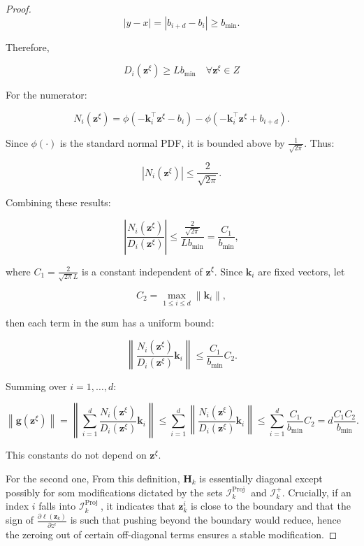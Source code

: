 \documentclass{article}
\theoremstyle{plain}
\theoremstyle{definition}
\def \H {\mathbf{H}}
\def \sI {\mathcal{I}}
\def \H {\mathbf{H}}
\def \H {\mathbf{H}}
\begin{document}
\begin{proof}
\[
|y-x|=\left|b_{i+d}-b_i\right| \geq b_{\min}.
\]


Therefore,

\[
D_i\left(\mathbf{z}^{\xi}\right) \geq L b_{\min } \quad \forall \mathbf{z}^{\xi} \in Z
\]

For the numerator:

\[
N_i\left(\mathbf{z}^{\xi}\right)=\phi\left(-\mathbf{k}_i^{\top} \mathbf{z}^{\xi}-b_i\right)-\phi\left(-\mathbf{k}_i^{\top} \mathbf{z}^{\xi}+b_{i+d}\right) .
\]


Since $\phi(\cdot)$ is the standard normal PDF, it is bounded above by $\frac{1}{\sqrt{2 \pi}}$. Thus:

\[
\left|N_i\left(\mathbf{z}^{\xi}\right)\right| \leq \frac{2}{\sqrt{2 \pi}}.
\]


Combining these results:

\[
\left|\frac{N_i\left(\mathbf{z}^{\xi}\right)}{D_i\left(\mathbf{z}^{\xi}\right)}\right| \leq \frac{\frac{2}{\sqrt{2 \pi}}}{L b_{\min }}=\frac{C_1}{b_{\min }},
\]

where $C_1=\frac{2}{\sqrt{2 \pi} L}$ is a constant independent of $\mathbf{z}^{\xi}$. 
Since $\mathbf{k}_i$ are fixed vectors, let

\[
C_2=\max _{1 \leq i \leq d}\left\|\mathbf{k}_i\right\|, 
\]


then each term in the sum has a uniform bound: 

\[
  \left\|\frac{N_i\left(\mathbf{z}^{\xi}\right)}{D_i\left(\mathbf{z}^{\xi}\right)} \mathbf{k}_i\right\| \leq \frac{C_1}{b_{\min }} C_2.
\]


Summing over $i=1, \ldots, d$: 

\[
  \left\|\mathbf{g}\left(\mathbf{z}^{\xi}\right)\right\|=\left\|\sum_{i=1}^d \frac{N_i\left(\mathbf{z}^{\xi}\right)}{D_i\left(\mathbf{z}^{\xi}\right)} \mathbf{k}_i\right\| \leq \sum_{i=1}^d\left\|\frac{N_i\left(\mathbf{z}^{\xi}\right)}{D_i\left(\mathbf{z}^{\xi}\right)} \mathbf{k}_i\right\| \leq \sum_{i=1}^d \frac{C_1}{b_{\min }} C_2=d \frac{C_1 C_2}{b_{\min }}.
\]


This constants do not depend on $\mathbf{z}^{\xi}$. 

For the second one, From this definition, $\H_k$ is essentially diagonal except possibly for som modifications dictated by the sets $\sI_k^{\text {Proj }}$ and $\sI_k^{+}$. Crucially, if an index $i$ falls into $\sI_k^{\text {Proj }}$, it indicates that $\mathbf{z}_k^i$ is close to the boundary and that the sign of $\frac{\partial \ell\left(\mathbf{z}_k\right)}{\partial z^i}$ is such that pushing beyond the boundary would reduce, hence the zeroing out of certain off-diagonal terms ensures a stable modification. 


\end{proof}
\end{document}
